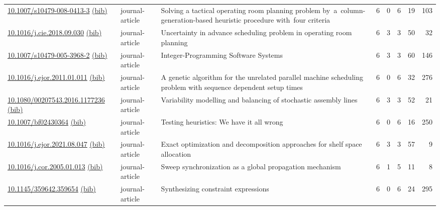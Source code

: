 {\begin{longtable}{p{5cm}lp{11cm}rrrrr}
\href{http://dx.doi.org/10.1007/s10479-008-0413-3}{10.1007/s10479-008-0413-3} \href{https://www.doi2bib.org/bib/10.1007/s10479-008-0413-3}{(bib)} & journal-article & Solving a tactical operating room planning problem by a column-generation-based heuristic procedure with four criteria & 6 & 0 & 6 & 19 & 103 \\
\href{http://dx.doi.org/10.1016/j.cie.2018.09.030}{10.1016/j.cie.2018.09.030} \href{https://www.doi2bib.org/bib/10.1016/j.cie.2018.09.030}{(bib)} & journal-article & Uncertainty in advance scheduling problem in operating room planning & 6 & 3 & 3 & 50 & 32 \\
\href{http://dx.doi.org/10.1007/s10479-005-3968-2}{10.1007/s10479-005-3968-2} \href{https://www.doi2bib.org/bib/10.1007/s10479-005-3968-2}{(bib)} & journal-article & Integer-Programming Software Systems & 6 & 3 & 3 & 60 & 146 \\
\href{http://dx.doi.org/10.1016/j.ejor.2011.01.011}{10.1016/j.ejor.2011.01.011} \href{https://www.doi2bib.org/bib/10.1016/j.ejor.2011.01.011}{(bib)} & journal-article & A genetic algorithm for the unrelated parallel machine scheduling problem with sequence dependent setup times & 6 & 0 & 6 & 32 & 276 \\
\href{http://dx.doi.org/10.1080/00207543.2016.1177236}{10.1080/00207543.2016.1177236} \href{https://www.doi2bib.org/bib/10.1080/00207543.2016.1177236}{(bib)} & journal-article & Variability modelling and balancing of stochastic assembly lines & 6 & 3 & 3 & 52 & 21 \\
\href{http://dx.doi.org/10.1007/bf02430364}{10.1007/bf02430364} \href{https://www.doi2bib.org/bib/10.1007/bf02430364}{(bib)} & journal-article & Testing heuristics: We have it all wrong & 6 & 0 & 6 & 16 & 250 \\
\href{http://dx.doi.org/10.1016/j.ejor.2021.08.047}{10.1016/j.ejor.2021.08.047} \href{https://www.doi2bib.org/bib/10.1016/j.ejor.2021.08.047}{(bib)} & journal-article & Exact optimization and decomposition approaches for shelf space allocation & 6 & 3 & 3 & 57 & 9 \\
\href{http://dx.doi.org/10.1016/j.cor.2005.01.013}{10.1016/j.cor.2005.01.013} \href{https://www.doi2bib.org/bib/10.1016/j.cor.2005.01.013}{(bib)} & journal-article & Sweep synchronization as a global propagation mechanism & 6 & 1 & 5 & 11 & 8 \\
\href{http://dx.doi.org/10.1145/359642.359654}{10.1145/359642.359654} \href{https://www.doi2bib.org/bib/10.1145/359642.359654}{(bib)} & journal-article & Synthesizing constraint expressions & 6 & 0 & 6 & 24 & 295 \\

\end{longtable}}

